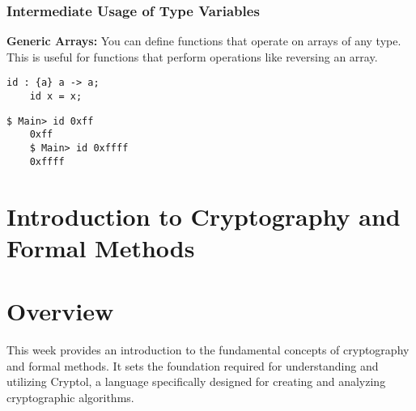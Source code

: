 \subsubsection{Intermediate Usage of Type Variables}
\textbf{Generic Arrays:} You can define functions that operate on arrays of any type. This is useful for functions that perform operations like reversing an array.
\begin{lstlisting}[style=cryptol]
	id : {a} a -> a;
	id x = x;
\end{lstlisting}
\begin{lstlisting}[style=zsh]
	$ Main> id 0xff
	0xff
	$ Main> id 0xffff
	0xffff
\end{lstlisting}



\newpage
\iffalse
%
%
%
%
\section{Introduction to Cryptography and Formal Methods}
%
\section*{Overview}
This week provides an introduction to the fundamental concepts of cryptography and formal methods. It sets the foundation required for understanding and utilizing Cryptol, a language specifically designed for creating and analyzing cryptographic algorithms.

